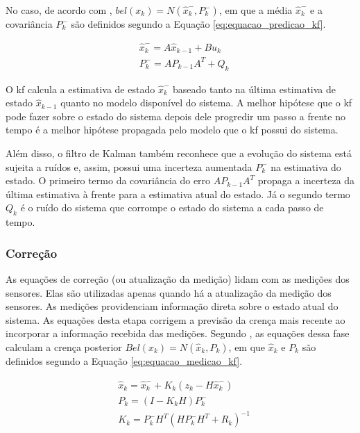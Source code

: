 \documentclass[acronym, symbols, table]{fei}
\begin{document}
				No caso, de acordo com \textcite{thrun2002probabilistic}, $bel(x_k) = N(\hat{x}_{k}^{-},P_{k}^{-})$, em que a média $\hat{x}_{k}^{-}$ e a covariância $P_{k}^{-}$ são definidos segundo a Equação \eqref{eq:equacao_predicao_kf}.
				
				\begin{equation} \label{eq:equacao_predicao_kf}
					\begin{split}
						&\hat{x}_{k}^{-} = A\hat{x}_{k-1} + Bu_{k} \\
						&P_{k}^{-} = AP_{k-1}A^{T} + Q_{k}					
					\end{split}
				\end{equation}
			
				O \acrshort{kf} calcula a estimativa de estado $\hat{x}_{k}^{-}$ baseado tanto na última estimativa de estado $\hat{x}_{k-1}$ quanto no modelo disponível do sistema. A melhor hipótese que o \acrshort{kf} pode fazer sobre o estado do sistema depois dele progredir um passo a frente no tempo é a melhor hipótese propagada pelo modelo que o \acrshort{kf} possui do sistema.
				
				Além disso, o filtro de Kalman também reconhece que a evolução do sistema está sujeita a ruídos e, assim, possui uma incerteza aumentada $P_{k}^{-}$ na estimativa do estado. O primeiro termo da covariância do erro $AP_{k-1}A^{T}$ propaga a incerteza da última estimativa à frente para a estimativa atual do estado. Já o segundo termo $Q_{k}$ é o ruído do sistema que corrompe o estado do sistema a cada passo de tempo.
			
			\subsubsection{Correção}
			
				As equações de correção (ou atualização da medição) lidam com as medições dos sensores. Elas são utilizadas apenas quando há a atualização da medição dos sensores. As medições providenciam informação direta sobre o estado atual do sistema. As equações desta etapa corrigem a previsão da crença mais recente ao incorporar a informação recebida das medições. Segundo \textcite{thrun2002probabilistic}, as equações dessa fase calculam a crença posterior $Bel(x_k) = N(\hat{x}_{k},P_{k})$, em que $\hat{x}_{k}$ e $P_{k}$ são definidos segundo a Equação \eqref{eq:equacao_medicao_kf}.
				
				\begin{equation} \label{eq:equacao_medicao_kf}
					\begin{split}
						&\hat{x}_{k} = \hat{x}_{k}^{-} + K_{k}(z_k - H\hat{x}_{k}^{-}) \\
						&P_{k} = (I - K_kH)P_{k}^{-} \\
						&K_k =  P_{k}^{-}H^T(HP_{k}^{-}H^T + R_k)^{-1}
					\end{split}
				\end{equation}
			
\end{document}
